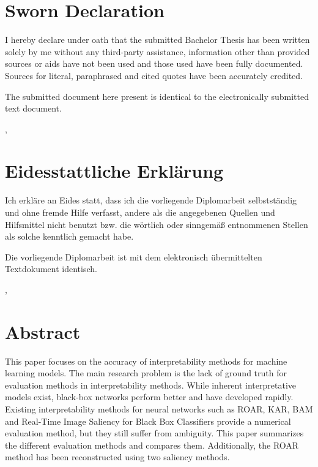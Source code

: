 
	\ifeng \chapter*{Sworn Declaration}
	I hereby declare under oath that the submitted Bachelor Thesis has been written solely by me without any third-party assistance, information other than provided sources or aids have not been used and those used have been fully documented. Sources for literal, paraphrased and cited quotes have been accurately credited.

	The submitted document here present is identical to the electronically submitted text document.

	\vskip1cm
	\place, \date

	\else \chapter*{Eidesstattliche Erklärung}
	Ich erkläre an Eides statt, dass ich die vorliegende Diplomarbeit selbstständig und ohne fremde Hilfe verfasst, andere als die angegebenen Quellen und Hilfsmittel nicht benutzt bzw. die wörtlich oder sinngemäß entnommenen Stellen als solche kenntlich gemacht habe.

	Die vorliegende Diplomarbeit ist mit dem elektronisch übermittelten Textdokument identisch.

	\vskip1cm
	\place, \date
	\fi

		\chapter*{Abstract}

	This paper focuses on the accuracy of interpretability methods for machine learning models. The main research problem is the lack of ground truth for evaluation methods in interpretability methods. While inherent interpretative models exist, black-box networks perform better and have developed rapidly. Existing interpretability methods for neural networks such as ROAR, KAR, BAM and Real-Time Image Saliency for Black Box Classifiers provide a numerical evaluation method, but they still suffer from ambiguity.
	This paper summarizes the different evaluation methods and compares them. Additionally, the ROAR method has been reconstructed using two saliency methods.
	
	


